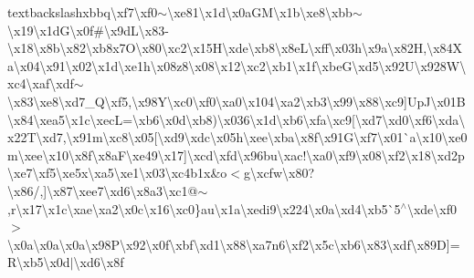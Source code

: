 \begin{DoxyCompactItemize}
textbackslash{}xbbq\textbackslash{}xf7\textbackslash{}xf0$\sim$\textbackslash{}xe81\textbackslash{}x1d\textbackslash{}x0a\+G\+M\textbackslash{}x1b\textbackslash{}xe8\textbackslash{}xbb$\sim$\textbackslash{}x19\textbackslash{}x1d\+G\textbackslash{}x0f\#\textbackslash{}x9d\+L\textbackslash{}x83-\/\textbackslash{}x18\textbackslash{}x8b\textbackslash{}x82\textbackslash{}xb8x7\+O\textbackslash{}x80\textbackslash{}xc2\textbackslash{}x15\+H\textbackslash{}xde\textbackslash{}xb8\textbackslash{}x8e\+L\textbackslash{}xff\textbackslash{}x03h\textbackslash{}x9a\textbackslash{}x82\+H,\textbackslash{}x84\+Xa\textbackslash{}x04\textbackslash{}x91\textbackslash{}x02\textbackslash{}x1d\textbackslash{}xe1h\textbackslash{}x08z8\textbackslash{}x08\textquotesingle{}\textbackslash{}x12\textbackslash{}xc2\textbackslash{}xb1\textbackslash{}x1f\textbackslash{}xbe\+G\textbackslash{}xd5\textbackslash{}x92\+U\textbackslash{}x928\+W\textbackslash{}xc4\textbackslash{}xaf\textbackslash{}xdf$\sim$\textbackslash{}x83\textbackslash{}xe8\textbackslash{}xd7\+\_\+\+Q\textbackslash{}xf5,\textbackslash{}x98\+Y\textbackslash{}xc0\textbackslash{}xf0\textbackslash{}xa0\textbackslash{}x104\textbackslash{}xa2\textbackslash{}xb3\textbackslash{}x99\textbackslash{}x88\textbackslash{}xc9\mbox{]}\+Up\+J\textbackslash{}x01\+B\textbackslash{}x84\textbackslash{}xea5\textbackslash{}x1c\textbackslash{}xec\+L=\textbackslash{}xb6\textbackslash{}x0d\textbackslash{}xb8)\textbackslash{}x036\textbackslash{}x1d\textbackslash{}xb6\textbackslash{}xfa\textbackslash{}xc9\mbox{[}\textbackslash{}xd7\textbackslash{}xd0\textbackslash{}xf6\textbackslash{}xda\textbackslash{}x22\+T\textbackslash{}xd7,\textbackslash{}x91m\textbackslash{}xc8\textbackslash{}x05\mbox{[}\textbackslash{}xd9\textbackslash{}xdc\textbackslash{}x05h\textbackslash{}xee\textbackslash{}xba\textbackslash{}x8f\textbackslash{}x91\+G\textbackslash{}xf7\textbackslash{}x01\`{}a\textbackslash{}x10\textbackslash{}xe0m\textbackslash{}xee\textbackslash{}x10\textbackslash{}x8f\textbackslash{}x8a\+F\textbackslash{}xe49\textbackslash{}x17\mbox{]}\textbackslash{}xcd\textbackslash{}xfd\textbackslash{}x96bu\textbackslash{}xac!\textbackslash{}xa0\textbackslash{}xf9\textbackslash{}x08\textbackslash{}xf2\textbackslash{}x18\textbackslash{}xd2p\textbackslash{}xe7\textbackslash{}xf5\textbackslash{}xe5x\textbackslash{}xa5\textbackslash{}xe1\textbackslash{}x03\textbackslash{}xc4b1x\&o$<$g\textbackslash{}xcfw\textbackslash{}x80?\textbackslash{}x86/,\mbox{]}\textbackslash{}x87\textbackslash{}xee7\textbackslash{}xd6\textbackslash{}x8a3\textbackslash{}xc1@$\sim$,r\textbackslash{}x17\textbackslash{}x1c\textbackslash{}xae\textbackslash{}xa2\textbackslash{}x0c\textbackslash{}x16\textbackslash{}xc0\}au\textbackslash{}x1a\textbackslash{}xedi9\textbackslash{}x224\textbackslash{}x0a\textbackslash{}xd4\textbackslash{}xb5\`{}5$^\wedge$\textbackslash{}xde\textbackslash{}xf0$>$\textbackslash{}x0a\textbackslash{}x0a\textbackslash{}x0a\textbackslash{}x98\+P\textbackslash{}x92\textbackslash{}x0f\textbackslash{}xbf\textbackslash{}xd1\textbackslash{}x88\textbackslash{}xa7n6\textbackslash{}xf2\textbackslash{}x5c\textbackslash{}xb6\textbackslash{}x83\textbackslash{}xdf\textbackslash{}x89\+D\mbox{]}=\+R\textbackslash{}xb5\textbackslash{}x0d$\vert$\textbackslash{}xd6\textbackslash{}x8f\textbacksl
\end{DoxyCompactItemize}

